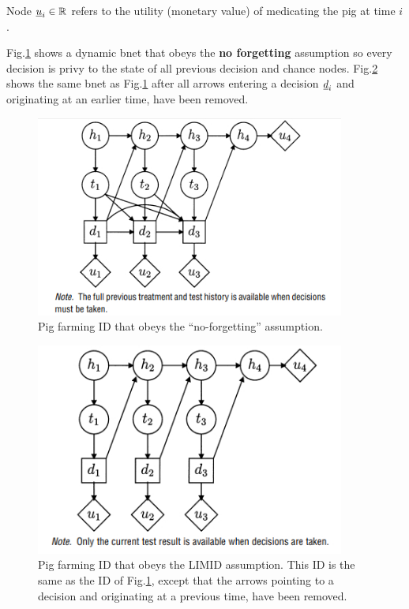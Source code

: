 \begin{itemize}
Node ${\underline{u}}_i\in { \mathbb{R}}$ refers to the utility (monetary value)  
of medicating the pig at time $i$.

 
Fig.\ref{fig-pre-limid} shows a dynamic bnet that
obeys the {\bf no forgetting} assumption so every decision is
privy to the state of all previous decision and chance nodes.
Fig.\ref{fig-post-limid} shows the same bnet as 
Fig.\ref{fig-pre-limid} after all arrows entering a decision ${\underline{d}}_i$ and originating at an earlier time, have been removed.



\begin{figure}[h!]
\centering
\includegraphics[width=4in]
{influ-diag/pre-limid.jpg}
\caption{Pig farming ID that obeys the \enquote{no-forgetting}
assumption.  
}
\label{fig-pre-limid}
\end{figure}


\begin{figure}[h!]
\centering
\includegraphics[width=4in]
{influ-diag/post-limid.jpg}
\caption{Pig farming ID that obeys the  LIMID
assumption. This ID is the same as the ID of Fig.\ref{fig-pre-limid},
except that the arrows pointing to a decision and originating at a previous time, have been removed.}
\label{fig-post-limid}
\end{figure}


\end{itemize}
